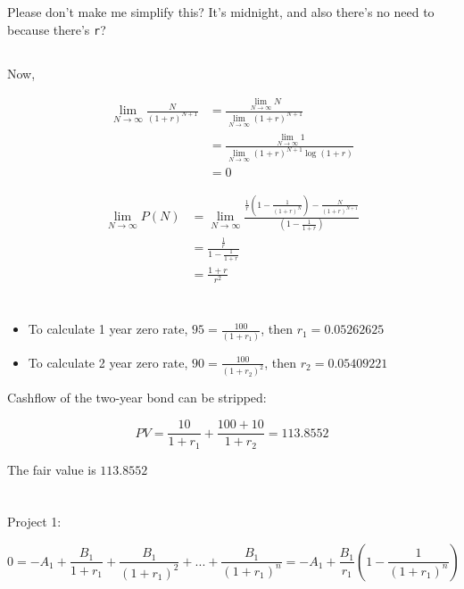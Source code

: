 \documentclass[11pt]{scrartcl}
\begin{document}
Please don't make me simplify this? It's midnight, and also there's no need to because there's \texttt{r}?

\subsection{}

Now,

\begin{align*}
\lim_{N \to \infty} \frac{N}{(1+r)^{N+1}} &= \frac{\lim_{N \to \infty} N}{\lim_{N \to \infty} (1+r)^{N+1}} \\
&= \frac{\lim_{N\to\infty}1}{\lim_{N\to\infty}(1+r)^{N+1} \log{(1+r)}} \\
&= 0
\end{align*}

\begin{align*}
\lim_{N \to \infty} P(N) &= \lim_{N \to \infty} \frac{\frac{1}{r}\left(1-\frac{1}{(1+r)^N}\right) - \frac{N}{(1+r)^{N+1}}}{\left(1 - \frac{1}{1+r}\right)} \\
&= \frac{\frac{1}{r}}{1-\frac{1}{1+r}} \\
&= \frac{1+r}{r^2}
\end{align*}

\section{}

\begin{itemize}
\item To calculate 1 year zero rate, $95 = \frac{100}{(1+r_1)}$, then $r_1 = 0.05262625$
\item To calculate 2 year zero rate, $90 = \frac{100}{(1+r_2)^2}$, then $r_2 = 0.05409221$
\end{itemize}

Cashflow of the two-year bond can be stripped:

\[PV = \frac{10}{1+r_1} + \frac{100 + 10}{1+r_2} = 113.8552\]

The fair value is $113.8552$

\section{}

Project 1:

\[0 = -A_1 + \frac{B_1}{1+r_1} + \frac{B_1}{(1+r_1)^2} + ... + \frac{B_1}{(1+r_1)^n} = -A_1 + \frac{B_1}{r_1} \left(1-\frac{1}{(1+r_1)^n}\right)\]
\end{document}
